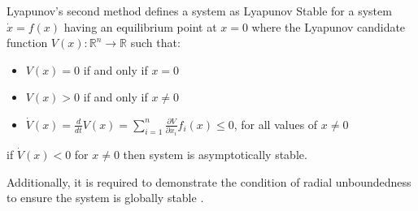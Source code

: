 Lyapunov's second method defines a system as Lyapunov Stable for a system $\dot{x}=f(x)$ having an equilibrium point at $x=0$ where the Lyapunov candidate function $V(x):\mathbb{R}^n \rightarrow \mathbb{R}$ such that:
\begin{itemize}
 \item $V(x)=0$ if and only if $x=0$
 \item $V(x)>0$ if and only if $x\neq0$
 \item $\dot{V}(x)=\frac{d}{dt}V(x)=\sum\limits_{i=1}^{n} \frac{\partial V}{\partial x_i}f_i(x) \leq 0$, for all values of $x\neq 0$  
\end{itemize}

if $\dot{V}(x) < 0$ for $x\neq 0$ then system is asymptotically stable.

Additionally, it is required to demonstrate the condition of radial unboundedness to ensure the system is globally stable \cite{khalil1996noninear}.














